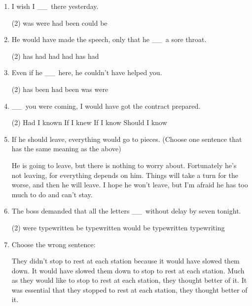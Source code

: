 \documentclass{yufa}
\newcommand\ttu{ \_\_\ }
\begin{document}
\begin{enumerate}
\item I wish I \ttu there yesterday.
  \begin{tasks}(2)
    \task was
    \task were
    \task had been
    \task could be
  \end{tasks}

\item He would have made the speech, only that he \ttu a sore throat.
  \begin{tasks}(2)
    \task has
    \task had
    \task had had
    \task has had
  \end{tasks}

\item Even if he \ttu here, he couldn't have helped you.
  \begin{tasks}(2)
    \task has been
    \task had been
    \task was
    \task were
  \end{tasks}

\item \ttu you were coming, I would have got the contract prepared.
  \begin{tasks}(2)
    \task Had I known
    \task If I knew
    \task If I know
    \task Should I know
  \end{tasks}

\item If he should leave, everything would go to pieces. (Choose one sentence that has the same meaning as the above)
  \begin{tasks}
    \task He is going to leave, but there is nothing to worry about.
    \task Fortunately he's not leaving, for everything depends on him.
    \task Things will take a turn for the worse, and then he will leave.
    \task I hope he won't leave, but I'm afraid he has too much to do and can't stay.
  \end{tasks}

\item The boss demanded that all the letters \ttu without delay by seven tonight.
  \begin{tasks}(2)
    \task were typewritten
    \task be typewritten
    \task would be typewritten
    \task typewriting
  \end{tasks}

\item Choose the wrong sentence:
  \begin{tasks}
    \task They didn't stop to rest at each station because it would have slowed them down.
    \task It would have slowed them down to stop to rest at each station.
    \task Much as they would like to stop to rest at each station, they thought better of it.
    \task It was essential that they stopped to rest at each station, they thought better of it.
  \end{tasks}


\end{enumerate}
\end{document}
